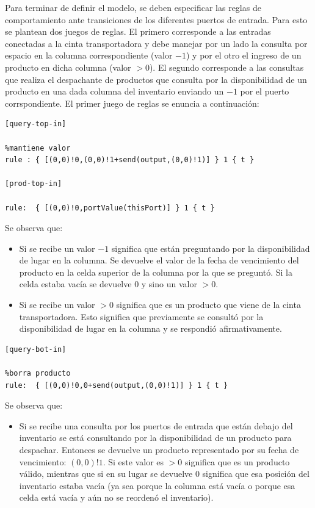 \documentclass[10pt]{article}
\begin{document}
Para terminar de definir el modelo, se deben especificar las reglas de comportamiento ante transiciones de los diferentes puertos de entrada. Para esto se plantean dos juegos de reglas. El primero corresponde a las entradas conectadas a la cinta transportadora y debe manejar por un lado la consulta por espacio en la columna correspondiente (valor $-1$) y por el otro el ingreso de un producto en dicha columna (valor $>0$). El segundo corresponde a las consultas que realiza el despachante de productos que consulta por la disponibilidad de un producto en una dada columna del inventario enviando un $-1$ por el puerto corrspondiente. El primer juego de reglas se enuncia a continuación:

\begin{minipage}{1\textwidth}
	\centering
	\begin{lstlisting}
[query-top-in]

%mantiene valor
rule : { [(0,0)!0,(0,0)!1+send(output,(0,0)!1)] } 1 { t }

[prod-top-in]

rule:  { [(0,0)!0,portValue(thisPort)] } 1 { t }
	\end{lstlisting}
\end{minipage}

Se observa que:
\begin{itemize}
  \item Si se recibe un valor $-1$ significa que están preguntando por la disponibilidad de lugar en la columna. Se devuelve el valor de la fecha de vencimiento del producto en la celda superior de la columna por la que se preguntó. Si la celda estaba vacía se devuelve $0$ y sino un valor $>0$.
  \item Si se recibe un valor $>0$ significa que es un producto que viene de la cinta transportadora. Esto significa que previamente se consultó por la disponibilidad de lugar en la columna y se respondió afirmativamente.
\end{itemize}

\begin{minipage}{1\textwidth}
	\centering
	\begin{lstlisting}
[query-bot-in]

%borra producto
rule:  { [(0,0)!0,0+send(output,(0,0)!1)] } 1 { t }
	\end{lstlisting}
\end{minipage}

Se observa que:
\begin{itemize}
  \item Si se recibe una consulta por los puertos de entrada que están debajo del inventario se está consultando por la disponibilidad de un producto para despachar. Entonces se devuelve un producto representado por su fecha de vencimiento: $(0,0)!1$. Si este valor es $>0$ significa que es un producto válido, mientras que si en su lugar se devuelve $0$ significa que esa posición del inventario estaba vacía (ya sea porque la columna está vacía o porque esa celda está vacía y aún no se reordenó el inventario).
\end{itemize}
\end{document}
